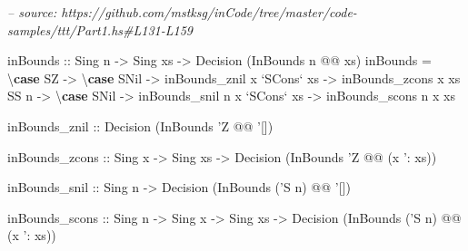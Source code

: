 \documentclass[]{article}
\newenvironment{Shaded}{}{}
\newcommand{\CommentTok}[1]{\textcolor[rgb]{0.38,0.63,0.69}{\textit{#1}}}
\newcommand{\DataTypeTok}[1]{\textcolor[rgb]{0.56,0.13,0.00}{#1}}
\newcommand{\FunctionTok}[1]{\textcolor[rgb]{0.02,0.16,0.49}{#1}}
\newcommand{\KeywordTok}[1]{\textcolor[rgb]{0.00,0.44,0.13}{\textbf{#1}}}
\newcommand{\NormalTok}[1]{#1}
\newcommand{\OtherTok}[1]{\textcolor[rgb]{0.00,0.44,0.13}{#1}}
\begin{document}
\begin{Shaded}
\begin{Highlighting}[]
\CommentTok{-- source: https://github.com/mstksg/inCode/tree/master/code-samples/ttt/Part1.hs#L131-L159}

\OtherTok{inBounds ::} \DataTypeTok{Sing}\NormalTok{ n }\OtherTok{->} \DataTypeTok{Sing}\NormalTok{ xs }\OtherTok{->} \DataTypeTok{Decision}\NormalTok{ (}\DataTypeTok{InBounds}\NormalTok{ n }\FunctionTok{@@}\NormalTok{ xs)}
\NormalTok{inBounds }\FunctionTok{=}\NormalTok{ \textbackslash{}}\KeywordTok{case}
    \DataTypeTok{SZ} \OtherTok{->}\NormalTok{ \textbackslash{}}\KeywordTok{case}
      \DataTypeTok{SNil}         \OtherTok{->}\NormalTok{ inBounds_znil}
\NormalTok{      x }\OtherTok{`SCons`}\NormalTok{ xs }\OtherTok{->}\NormalTok{ inBounds_zcons x xs}
    \DataTypeTok{SS}\NormalTok{ n }\OtherTok{->}\NormalTok{ \textbackslash{}}\KeywordTok{case}
      \DataTypeTok{SNil}         \OtherTok{->}\NormalTok{ inBounds_snil n}
\NormalTok{      x }\OtherTok{`SCons`}\NormalTok{ xs }\OtherTok{->}\NormalTok{ inBounds_scons n x xs}

\NormalTok{inBounds_znil}
\OtherTok{    ::} \DataTypeTok{Decision}\NormalTok{ (}\DataTypeTok{InBounds}\NormalTok{ '}\DataTypeTok{Z} \FunctionTok{@@}\NormalTok{ '[])}

\NormalTok{inBounds_zcons}
\OtherTok{    ::} \DataTypeTok{Sing}\NormalTok{ x}
    \OtherTok{->} \DataTypeTok{Sing}\NormalTok{ xs}
    \OtherTok{->} \DataTypeTok{Decision}\NormalTok{ (}\DataTypeTok{InBounds}\NormalTok{ '}\DataTypeTok{Z} \FunctionTok{@@}\NormalTok{ (x '}\FunctionTok{:}\NormalTok{ xs))}

\NormalTok{inBounds_snil}
\OtherTok{    ::} \DataTypeTok{Sing}\NormalTok{ n}
    \OtherTok{->} \DataTypeTok{Decision}\NormalTok{ (}\DataTypeTok{InBounds}\NormalTok{ ('}\DataTypeTok{S}\NormalTok{ n) }\FunctionTok{@@}\NormalTok{ '[])}

\NormalTok{inBounds_scons}
\OtherTok{    ::} \DataTypeTok{Sing}\NormalTok{ n}
    \OtherTok{->} \DataTypeTok{Sing}\NormalTok{ x}
    \OtherTok{->} \DataTypeTok{Sing}\NormalTok{ xs}
    \OtherTok{->} \DataTypeTok{Decision}\NormalTok{ (}\DataTypeTok{InBounds}\NormalTok{ ('}\DataTypeTok{S}\NormalTok{ n) }\FunctionTok{@@}\NormalTok{ (x '}\FunctionTok{:}\NormalTok{ xs))}
\end{Highlighting}
\end{Shaded}
\end{document}
